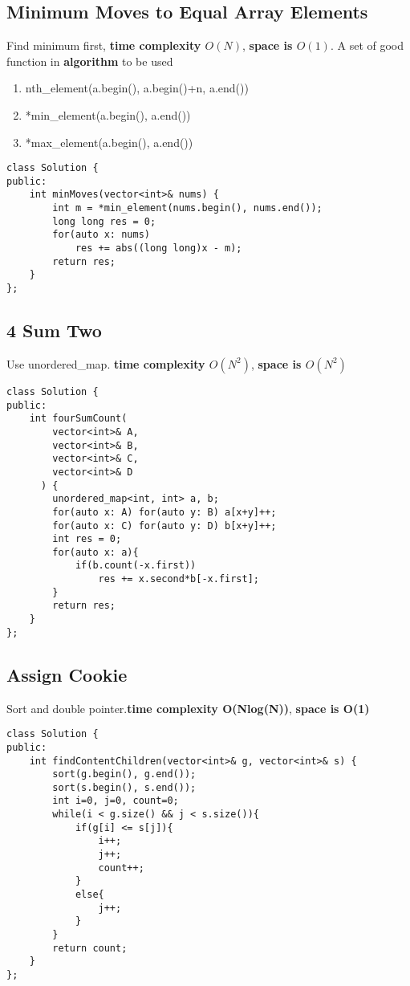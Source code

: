 \subsection{Minimum Moves to Equal Array Elements}

Find minimum first, {\color{blue}\textbf{time complexity $O(N)$}}, {\color{blue}\textbf{space is $O(1)$}}. A set of good function in \textbf{algorithm} to be used

\begin{enumerate}
  \item nth\_element(a.begin(), a.begin()+n, a.end())
  \item *min\_element(a.begin(), a.end())
  \item *max\_element(a.begin(), a.end())
\end{enumerate}



\begin{lstlisting}
class Solution {
public:
    int minMoves(vector<int>& nums) {
        int m = *min_element(nums.begin(), nums.end());
        long long res = 0;
        for(auto x: nums)
            res += abs((long long)x - m);
        return res;
    }
};
\end{lstlisting}



\subsection{4 Sum Two}
Use unordered\_map. {\color{blue}\textbf{time complexity $O(N^2)$}}, {\color{blue}\textbf{space is $O(N^2)$}}

\begin{lstlisting}
class Solution {
public:
    int fourSumCount(
        vector<int>& A,
        vector<int>& B,
        vector<int>& C,
        vector<int>& D
      ) {
        unordered_map<int, int> a, b;
        for(auto x: A) for(auto y: B) a[x+y]++;
        for(auto x: C) for(auto y: D) b[x+y]++;
        int res = 0;
        for(auto x: a){
            if(b.count(-x.first))
                res += x.second*b[-x.first];
        }
        return res;
    }
};
\end{lstlisting}


\subsection{Assign Cookie}
Sort and double pointer.{\color{blue}\textbf{time complexity O(Nlog(N))}}, {\color{blue}\textbf{space is O(1)}}
\begin{lstlisting}
class Solution {
public:
    int findContentChildren(vector<int>& g, vector<int>& s) {
        sort(g.begin(), g.end());
        sort(s.begin(), s.end());
        int i=0, j=0, count=0;
        while(i < g.size() && j < s.size()){
            if(g[i] <= s[j]){
                i++;
                j++;
                count++;
            }
            else{
                j++;
            }
        }
        return count;
    }
};
\end{lstlisting}


